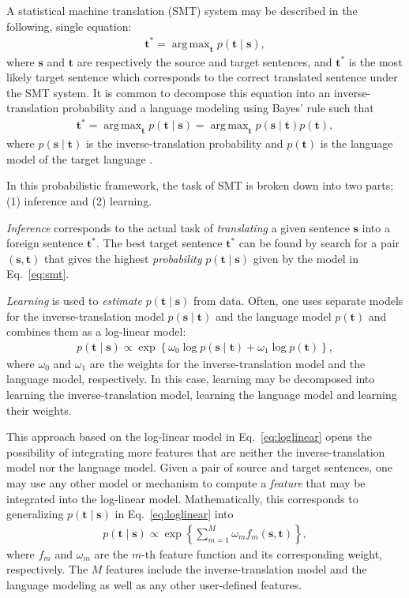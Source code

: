 \documentclass[11pt, oneside]{essay}
\newcommand{\vect}[1]{\mathbf{#1}}
\newcommand{\vs}[0]{\vect{s}}
\newcommand{\vt}[0]{\vect{t}}
\DeclareMathOperator*{\argmax}{arg\,max}
\begin{document}
A statistical machine translation (SMT) system may be described
in the following, single equation:
\begin{align}
    \label{eq:smt_fund}
    \vt^* = \argmax_{\vt} p(\vt \mid \vs),
\end{align}
where $\vs$ and $\vt$ are respectively the source and target
sentences, and $\vt^*$ is the most likely target sentence which
corresponds to the correct translated sentence under the SMT
system. It is common to decompose this equation into an
inverse-translation probability and a language modeling using
Bayes' rule such that
\begin{align}
    \label{eq:smt}
    \vt^* = \argmax_{\vt} p(\vt \mid \vs) 
    = \argmax_{\vt} p(\vs \mid \vt) p(\vt),
\end{align}
where $p(\vs \mid \vt)$ is the inverse-translation probability
and $p(\vt)$ is the language model of the target language
\citep{Koehn2010}.

In this probabilistic framework, the task of SMT is broken down
into two parts; (1) inference and (2) learning. 

\textit{Inference} corresponds to the actual task of \textit{translating} a
given sentence $\vs$ into a foreign sentence $\vt^*$. The best
target sentence $\vt^*$ can be found by search for a pair
$\left(\vs, \vt\right)$ that gives the highest
\textit{probability} $p(\vt \mid \vs)$ given by the model in
Eq.~\eqref{eq:smt}.

\textit{Learning} is used to \textit{estimate} $p(\vt \mid \vs)$
from data.  Often, one uses separate models for the
inverse-translation model $p(\vs \mid \vt)$ and the language
model $p(\vt)$ and combines them as a log-linear model:
\begin{align}
    \label{eq:loglinear}
    p(\vt \mid \vs) \propto \exp\left\{ \omega_0 \log p(\vs \mid
    \vt) + \omega_1 \log p(\vt) \right\}, 
\end{align}
where $\omega_0$ and $\omega_1$ are the weights for the
inverse-translation model and the language model, respectively.
In this case, learning may be decomposed into learning the
inverse-translation model, learning the language model and
learning their weights.

This approach based on the log-linear model in
Eq.~\eqref{eq:loglinear} opens the possibility of integrating
more features that are neither the inverse-translation model nor
the language model. Given a pair of source and target sentences,
one may use any other model or mechanism to compute a
\textit{feature} that may be integrated into the log-linear
model. Mathematically, this corresponds to generalizing $p(\vt
\mid \vs)$ in Eq.~\eqref{eq:loglinear} into
\begin{align}
\label{eq:loglinear_general}
    p(\vt \mid \vs) \propto \exp\left\{  
    \sum_{m=1}^M \omega_m f_m(\vs, \vt)
    \right\}, 
\end{align}
where $f_m$ and $\omega_m$ are the $m$-th feature function and
its corresponding weight, respectively. The $M$ features include
the inverse-translation model and the language modeling as well
as any other user-defined features.
\end{document}
